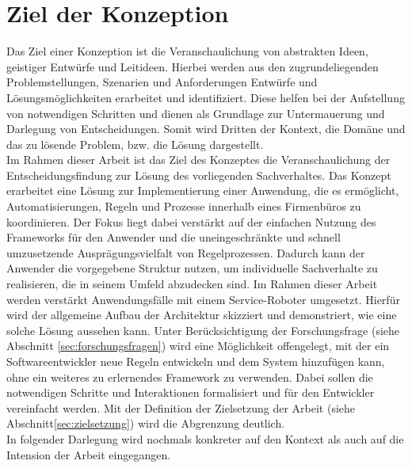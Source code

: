 \section{Ziel der Konzeption}
\label{sec:konzeptziele}
    Das Ziel einer Konzeption ist die Veranschaulichung von abstrakten Ideen, geistiger Entwürfe und Leitideen. 
    Hierbei werden aus den zugrundeliegenden Problemstellungen, Szenarien und Anforderungen Entwürfe und 
    Lösungsmöglichkeiten erarbeitet und identifiziert. Diese helfen bei der Aufstellung von notwendigen Schritten 
    und dienen als Grundlage zur Untermauerung und Darlegung von Entscheidungen. Somit wird Dritten der Kontext, die 
    Domäne und das zu lösende Problem, bzw. die Lösung dargestellt. 
    \\
    \linebreak
    Im Rahmen dieser Arbeit ist das Ziel des Konzeptes die Veranschaulichung der Entscheidungsfindung zur Lösung des vorliegenden 
    Sachverhaltes. Das Konzept 
    erarbeitet eine Lösung zur Implementierung einer Anwendung, die es ermöglicht, Automatisierungen, Regeln und Prozesse innerhalb eines 
    Firmenbüros zu koordinieren. Der Fokus liegt dabei verstärkt auf der einfachen Nutzung des Frameworks für den Anwender und 
    die uneingeschränkte und schnell umzusetzende Ausprägungsvielfalt von Regelprozessen. Dadurch kann der Anwender die vorgegebene Struktur nutzen, um individuelle 
    Sachverhalte zu realisieren, die in seinem Umfeld abzudecken sind. Im Rahmen dieser Arbeit werden verstärkt Anwendungsfälle mit einem Service-Roboter 
    umgesetzt.
    Hierfür wird der allgemeine Aufbau der Architektur skizziert und demonstriert, wie eine solche Lösung aussehen kann. 
    Unter Berücksichtigung der Forschungsfrage (siehe Abschnitt \ref{sec:forschungsfragen}) wird eine Möglichkeit offengelegt, mit der 
    ein Softwareentwickler neue Regeln entwickeln und dem System hinzufügen kann, ohne ein weiteres zu erlernendes Framework zu verwenden. 
    Dabei sollen die notwendigen Schritte und Interaktionen formalisiert und für den Entwickler vereinfacht werden. Mit der 
    Definition der Zielsetzung der Arbeit (siehe Abschnitt\ref{sec:zielsetzung}) wird die Abgrenzung deutlich. 
    \\
    \linebreak
    In folgender Darlegung wird nochmals konkreter auf den Kontext als auch auf die Intension der Arbeit eingegangen. 

